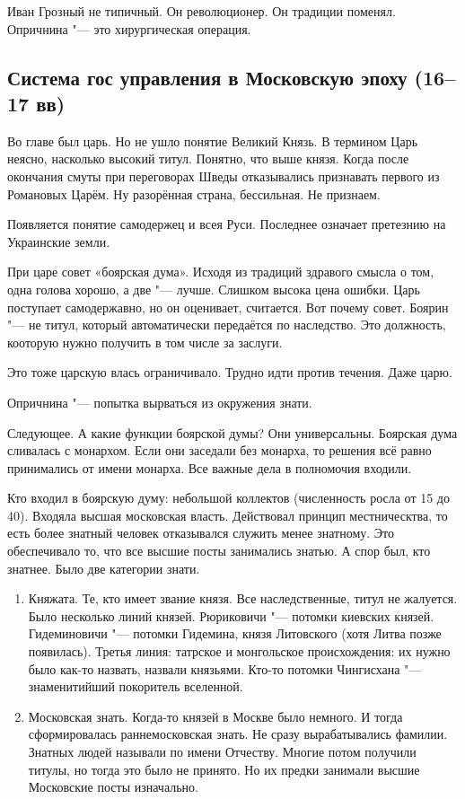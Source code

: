 Иван Грозный не типичный. Он революционер. Он традиции поменял. Опричнина "--- это хирургическая операция.

\subsection{Система гос управления в Московскую эпоху (16--17 вв)}
Во главе был царь. Но не ушло понятие Великий Князь. В термином Царь неясно, насколько высокий титул. Понятно, что выше князя. Когда после окончания смуты при переговорах Шведы отказывались признавать первого из Романовых Царём. Ну разорённая страна, бессильная. Не признаем.

Появляется понятие самодержец и всея Руси. Последнее означает претезнию на Украинские земли.

При царе совет «боярская дума». Исходя из традиций здравого смысла о том, одна голова хорошо, а две "--- лучше. Слишком высока цена ошибки. Царь поступает самодержавно, но он оценивает, считается. Вот почему совет. Боярин "--- не титул, который автоматически передаётся по наследство. Это должность, кооторую нужно получить в том числе за заслуги.

Это тоже царскую влась ограничивало. Трудно идти против течения. Даже царю.

Опричнина "--- попытка вырваться из окружения знати.

Следующее. А какие функции боярской думы? Они универсальны. Боярская дума сливалась с монархом. Если они заседали без монарха, то решения всё равно принимались от имени монарха. Все важные дела в полномочия входили.

Кто входил в боярскую думу: небольшой коллектов (численность росла от 15 до 40). Входяла высшая московская власть. Действовал принцип местническтва, то есть более знатный человек отказывался служить менее знатному. Это обеспечивало то, что все высшие посты занимались знатью. А спор был, кто знатнее. Было две категории знати.
\begin{enumerate}
\item Княжата. Те, кто имеет звание князя. Все наследственные, титул не жалуется. Было несколько линий князей. Рюриковичи "--- потомки киевских князей. Гидеминовичи "--- потомки Гидемина, князя Литовского (хотя Литва позже появилась). Третья линия: татрское и монгольское происхождения: их нужно было как-то назвать, назвали князьями. Кто-то потомки Чингисхана "--- знаменитийший покоритель вселенной. 

\item Московская знать. Когда-то князей в Москве было немного. И тогда сформировалась раннемосковская знать. Не сразу вырабатывались фамилии. Знатных людей называли по имени Отчеству. Многие потом получили титулы, но тогда это было не принято. Но их предки занимали высшие Московские посты изначально.
\end{enumerate}

